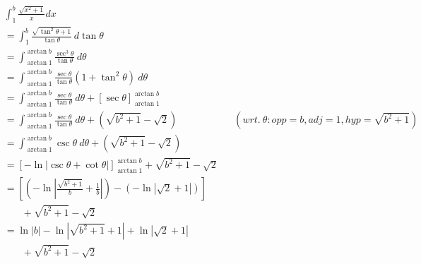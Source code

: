 \documentclass[MathsNotesBase.tex]{subfiles}
\begin{document}
  \begin{align*}
      & \int_1^b{\frac{\sqrt{x^2 + 1}}{x}}dx && \\[8pt]
      &= \int_1^b{\frac{\sqrt{\tan^2{\theta} + 1}}{\tan{\theta}}}\ d\tan{\theta} && \\[8pt]
      &= \int_{\arctan{1}}^{\arctan{b}}{\frac{\sec^3{\theta}}{\tan{\theta}}}\ d{\theta} && \\[8pt]
      &= \int_{\arctan{1}}^{\arctan{b}} {
          \frac{\sec{\theta}}{\tan{\theta}}(1 + \tan^2{\theta})
        }\ d{\theta} \\[8pt]
      &= \int_{\arctan{1}}^{\arctan{b}} { 
          \frac{\sec{\theta}}{\tan{\theta}} 
        }\ d{\theta} + \left[\sec{\theta}\right]_{\arctan{1}}^{\arctan{b}} \\[8pt]
      &= \int_{\arctan{1}}^{\arctan{b}} { 
          \frac{\sec{\theta}}{\tan{\theta}} 
        }\ d{\theta} + (\sqrt{b^2+1} - \sqrt{2}) && (wrt.\ \theta: opp=b, adj=1, hyp=\sqrt{b^2+1}) \\[8pt]
      &= \int_{\arctan{1}}^{\arctan{b}} { 
          \csc{\theta} 
        }\ d{\theta} + (\sqrt{b^2+1} - \sqrt{2}) \\[8pt]
      &= \left[-\ln\lvert\csc{\theta} +\cot{\theta}\rvert\right]_{\arctan{1}}^{\arctan{b}} + \sqrt{b^2+1} - \sqrt{2} \\[10pt]
      &= \left[
          \left(-\ln\left\lvert \frac{\sqrt{b^2+1}}{b} + \frac{1}{b} \right\rvert\right) - 
          \left(-\ln\left\lvert \sqrt{2} + 1 \right\rvert\right)
         \right] \\[6pt]
         &\ \ \ \ \ \ \ \ + \sqrt{b^2+1} - \sqrt{2} \\[10pt]
      &= \ln\left\lvert{b} \right\rvert - \ln\left\lvert{\sqrt{b^2+1} + 1} \right\rvert + \ln\left\lvert \sqrt{2} + 1 \right\rvert \\[4pt]
         &\ \ \ \ \ \ \ \  + \sqrt{b^2+1} - \sqrt{2}
  \end{align*}
  
  
\end{document}
